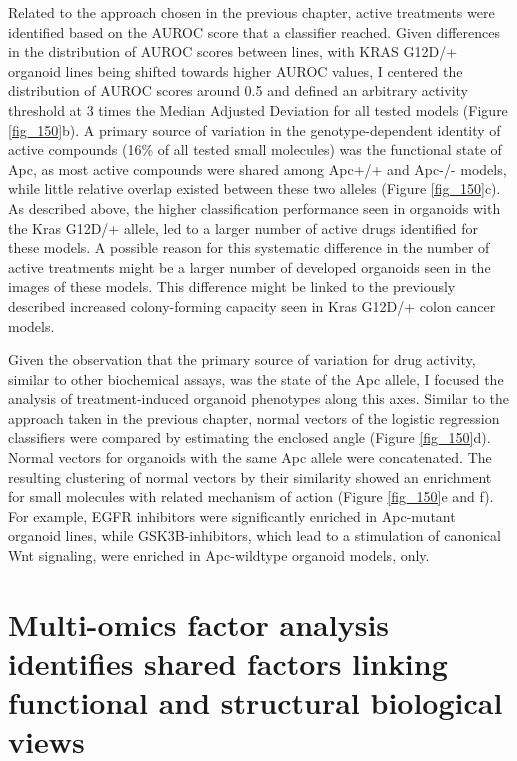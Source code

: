 \begin{flushleft}
Related to the approach chosen in the previous chapter, active treatments were identified based on the AUROC score that a classifier reached. Given differences in the distribution of AUROC scores between lines, with KRAS G12D/+ organoid lines being shifted towards higher AUROC values, I centered the distribution of AUROC scores around 0.5 and defined an arbitrary activity threshold at 3 times the Median Adjusted Deviation for all tested models (Figure \ref{fig_150}b). A primary source of variation in the genotype-dependent identity of active compounds (16\% of all tested small molecules) was the functional state of Apc, as most active compounds were shared among Apc+/+ and Apc-/- models, while little relative overlap existed between these two alleles (Figure \ref{fig_150}c). As described above, the higher classification performance seen in organoids with the Kras G12D/+ allele, led to a larger number of active drugs identified for these models. A possible reason for this systematic difference in the number of active treatments might be a larger number of developed organoids seen in the images of these models. This difference might be linked to the previously described increased colony-forming capacity seen in Kras G12D/+ colon cancer models.

Given the observation that the primary source of variation for drug activity, similar to other biochemical assays, was the state of the Apc allele, I focused the analysis of treatment-induced organoid phenotypes along this axes. Similar to the approach taken in the previous chapter, normal vectors of the logistic regression classifiers were compared by estimating the enclosed angle (Figure \ref{fig_150}d). Normal vectors for organoids with the same Apc allele were concatenated. The resulting clustering of normal vectors by their similarity showed an enrichment for small molecules with related mechanism of action (Figure \ref{fig_150}e and f). For example, EGFR inhibitors were significantly enriched in Apc-mutant organoid lines, while GSK3B-inhibitors, which lead to a stimulation of canonical Wnt signaling, were enriched in Apc-wildtype organoid models, only. 

\section{Multi-omics factor analysis identifies shared factors linking functional and structural biological views}


\end{flushleft}

